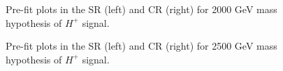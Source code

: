 \begin{figure}[H]
  \centering
  \caption{Pre-fit plots in the SR (left) and CR (right) for 2000 GeV mass hypothesis of $H^{+}$ signal.}
  \label{fig:Prefit_Hp2000_Asimov}
\end{figure}
\begin{figure}[H]
  \centering
  \caption{Pre-fit plots in the SR (left) and CR (right) for 2500 GeV mass hypothesis of $H^{+}$ signal.}
  \label{fig:Prefit_Hp2500_Asimov}
\end{figure}
